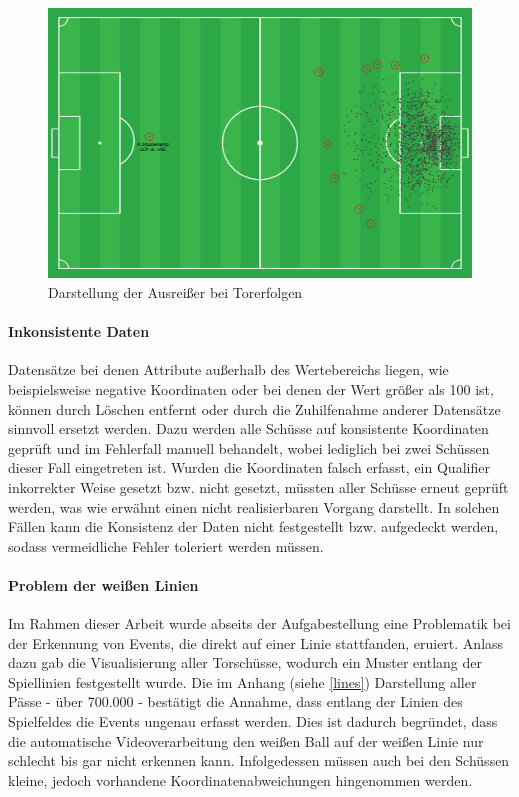 \begin{figure}
\centering
\includegraphics[scale=0.4]{se-wa-jpg/outlier_shots}
\caption[Darstellung der Ausreißer bei Torerfolgen]{Darstellung der Ausreißer bei Torerfolgen}
\label{outlier_shots}
\end{figure}

\paragraph{Inkonsistente Daten} 
Datensätze bei denen Attribute außerhalb des Wertebereichs liegen, wie beispielsweise negative Koordinaten oder bei denen der Wert größer als 100 ist, können durch Löschen entfernt oder durch die Zuhilfenahme anderer Datensätze sinnvoll ersetzt werden. Dazu werden alle Schüsse auf konsistente Koordinaten geprüft und im Fehlerfall manuell behandelt, wobei lediglich bei zwei Schüssen dieser Fall eingetreten ist. Wurden die Koordinaten falsch erfasst, ein Qualifier inkorrekter Weise gesetzt bzw. nicht gesetzt, müssten aller Schüsse erneut geprüft werden, was wie erwähnt einen nicht realisierbaren Vorgang darstellt. In solchen Fällen kann die Konsistenz der Daten nicht festgestellt bzw. aufgedeckt werden, sodass vermeidliche Fehler toleriert werden müssen.

\paragraph{Problem der weißen Linien} 
Im Rahmen dieser Arbeit wurde abseits der Aufgabestellung eine Problematik bei der Erkennung von Events, die direkt auf einer Linie stattfanden, eruiert. Anlass dazu gab die Visualisierung aller Torschüsse, wodurch ein Muster entlang der Spiellinien festgestellt wurde. Die im Anhang (siehe \vref{lines}) Darstellung aller Pässe - über 700.000 - bestätigt die Annahme, dass entlang der Linien des Spielfeldes die Events ungenau erfasst werden. Dies ist dadurch begründet, dass die automatische Videoverarbeitung den weißen Ball auf der weißen Linie nur schlecht bis gar nicht erkennen kann. Infolgedessen müssen auch bei den Schüssen kleine, jedoch vorhandene Koordinatenabweichungen hingenommen werden.
	
